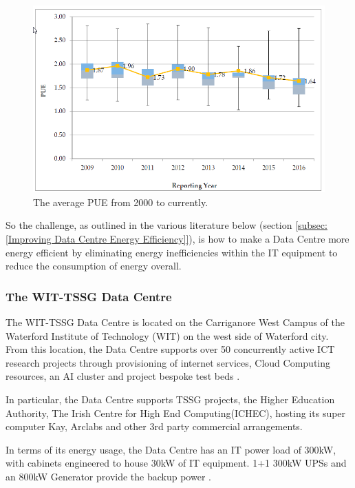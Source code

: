 \documentclass[12pt]{scrartcl}
\begin{document}
\begin{figure}[h]
  \caption{The average PUE from 2000 to currently.}
  \label{fig:PUE-by-year}
  \centering
    \includegraphics[scale=0.35]{Average_PUE_per_reporting_year}
\end{figure}
 
So the challenge, as outlined in the various literature below (section \ref{subsec:[Improving Data Centre Energy Efficiency]}), is how to make a Data Centre more energy efficient by eliminating energy inefficiencies within the IT equipment to reduce the consumption of energy overall. 

\subsubsection{The WIT-TSSG Data Centre}
\label{subsubsec:[The WIT-TSSG Data Centre]}

The WIT-TSSG Data Centre is located on the Carriganore West Campus of the Waterford Institute of Technology (WIT) on the west side of Waterford city. From this location, the Data Centre supports over 50 concurrently active ICT research projects through provisioning of internet services, Cloud Computing resources, an AI cluster and project bespoke test beds \citep{TSSG}. 

In particular, the Data Centre supports TSSG projects, the Higher Education Authority, The Irish Centre for High End Computing(ICHEC), hosting its super computer Kay, Arclabs and other 3rd party commercial arrangements.

In terms of its energy usage, the Data Centre has an IT power load of 300kW, with cabinets engineered to house 30kW of IT equipment. 1+1 300kW UPSs and an 800kW Generator provide the backup power \citep{TSSG}.
\end{document}
